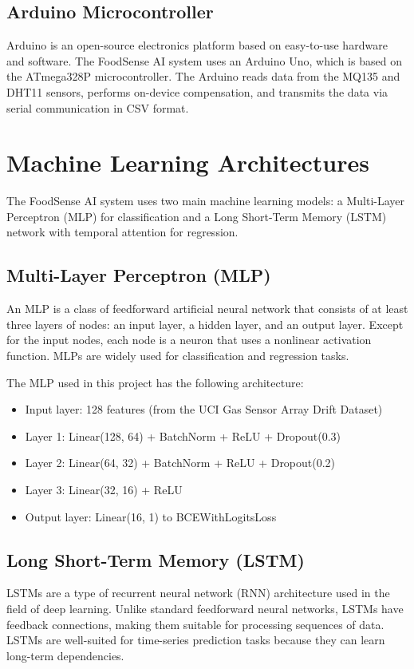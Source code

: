 \subsection{Arduino Microcontroller}
Arduino is an open-source electronics platform based on easy-to-use hardware and software. The FoodSense AI system uses an Arduino Uno, which is based on the ATmega328P microcontroller. The Arduino reads data from the MQ135 and DHT11 sensors, performs on-device compensation, and transmits the data via serial communication in CSV format.

\section{Machine Learning Architectures}
The FoodSense AI system uses two main machine learning models: a Multi-Layer Perceptron (MLP) for classification and a Long Short-Term Memory (LSTM) network with temporal attention for regression.

\subsection{Multi-Layer Perceptron (MLP)}
An MLP is a class of feedforward artificial neural network that consists of at least three layers of nodes: an input layer, a hidden layer, and an output layer. Except for the input nodes, each node is a neuron that uses a nonlinear activation function. MLPs are widely used for classification and regression tasks.

The MLP used in this project has the following architecture:
\begin{itemize}
    \item Input layer: 128 features (from the UCI Gas Sensor Array Drift Dataset)
    \item Layer 1: Linear(128, 64) + BatchNorm + ReLU + Dropout(0.3)
    \item Layer 2: Linear(64, 32) + BatchNorm + ReLU + Dropout(0.2)
    \item Layer 3: Linear(32, 16) + ReLU
    \item Output layer: Linear(16, 1) to BCEWithLogitsLoss
\end{itemize}

\subsection{Long Short-Term Memory (LSTM)}
LSTMs are a type of recurrent neural network (RNN) architecture used in the field of deep learning. Unlike standard feedforward neural networks, LSTMs have feedback connections, making them suitable for processing sequences of data. LSTMs are well-suited for time-series prediction tasks because they can learn long-term dependencies.

